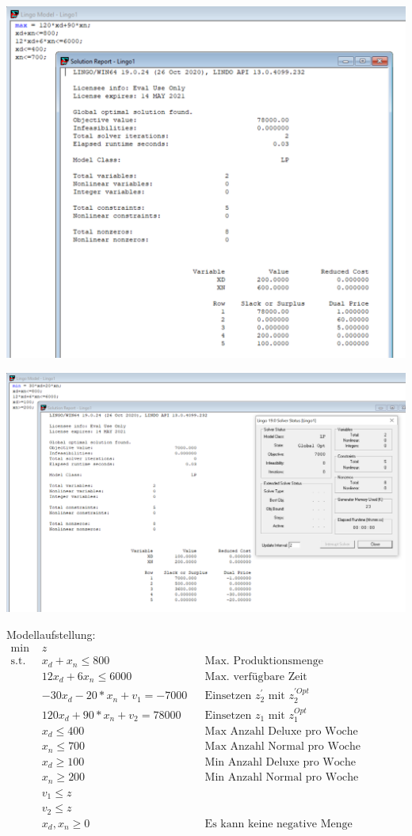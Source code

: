 \documentclass[a4paper,11pt]{article}
\begin{document}
\begin{centering}
	\includegraphics[width=0.65\linewidth]{src/blatt_7_aufgabe_2_solverloesung_1.png}
\end{centering}

\begin{centering}
	\includegraphics[width=0.65\linewidth]{src/blatt_7_aufgabe_2_solverloesung_2.png}
\end{centering}

\pagebreak
Modellaufstellung: \\

\begin{align*}
    \text{min } &z \\
    \text{s.t. } & x_{d} + x_{n} \le 800 && \text{Max. Produktionsmenge} \\
    & 12x_{d} + 6x_{n} \le 6000 && \text{Max. verfügbare Zeit} \\
    & -30x_{d} -20 * x_{n} + v_{1} = -7000 && \text{Einsetzen $z_{2}^{'}$ mit $z_{2}^{'Opt}$ } \\
    & 120x_{d} + 90 * x_{n} + v_{2} = 78000 && \text{Einsetzen $z_{1}$ mit $z_{1}^{Opt}$ } \\
    & x_{d} \le 400 && \text{Max Anzahl Deluxe pro Woche} \\
    & x_{n} \le 700 && \text{Max Anzahl Normal pro Woche} \\
    & x_{d} \ge 100 && \text{Min Anzahl Deluxe pro Woche} \\
    & x_{n} \ge 200 && \text{Min Anzahl Normal pro Woche} \\
    & v_{1} \le z && \text{} \\
    & v_{2} \le z && \text{} \\
    & x_{d}, x_{n} \ge 0 && \text{Es kann keine negative Menge produziert werden} \\
\end{align*}
\end{document}
